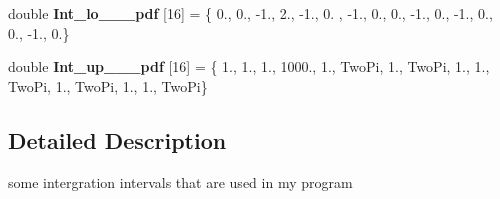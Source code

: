 \begin{DoxyCompactItemize}
\item 
\hypertarget{namespaceIntLimits_a8f5f2b2d899990f9914564f8b4d37e1b}{}double {\bfseries Int\+\_\+lo\+\_\+\_\+\_\+pdf} \mbox{[}16\mbox{]} = \{ 0., 0., -\/1., 2., -\/1., 0. , -\/1., 0., 0., -\/1., 0., -\/1., 0., 0., -\/1., 0.\}\label{namespaceIntLimits_a8f5f2b2d899990f9914564f8b4d37e1b}

\item 
\hypertarget{namespaceIntLimits_a5e31e056fef4f98dcdd589c1d604fa86}{}double {\bfseries Int\+\_\+up\+\_\+\_\+\_\+pdf} \mbox{[}16\mbox{]} = \{ 1., 1., 1., 1000., 1., Two\+Pi, 1., Two\+Pi, 1., 1., Two\+Pi, 1., Two\+Pi, 1., 1., Two\+Pi\}\label{namespaceIntLimits_a5e31e056fef4f98dcdd589c1d604fa86}

\end{DoxyCompactItemize}


\subsection{Detailed Description}
some intergration intervals that are used in my program 